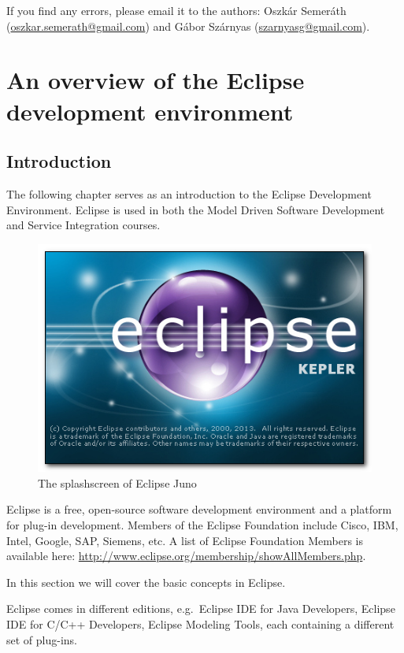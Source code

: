 \documentclass[]{report}
\let\Oldincludegraphics\includegraphics
\renewcommand{\includegraphics}[1]{
\begin{adjustbox}{max size={\textwidth}{\textheight}}
    \Oldincludegraphics[scale=0.6]{#1}%
\end{adjustbox}
}
\begin{document}
If you find any errors, please email it to the authors: Oszkár Semeráth
(\href{mailto:oszkar.semerath@gmail.com}{oszkar.semerath@gmail.com}) and
Gábor Szárnyas (\href{mailto:szarnyasg@gmail.com}{szarnyasg@gmail.com}).

\chapter{An overview of the Eclipse development environment}

\section{Introduction}

The following chapter serves as an introduction to the Eclipse
Development Environment. Eclipse is used in both the Model Driven
Software Development and Service Integration courses.

\begin{figure}[htbp]
\centering
\includegraphics{img/eclipse_basics/eclipse_logo.png}
\caption{The splashscreen of Eclipse Juno}
\end{figure}

Eclipse is a free, open-source software development environment and a
platform for plug-in development. Members of the Eclipse Foundation
include Cisco, IBM, Intel, Google, SAP, Siemens, etc. A list of Eclipse
Foundation Members is available here:
\url{http://www.eclipse.org/membership/showAllMembers.php}.

In this section we will cover the basic concepts in Eclipse.

Eclipse comes in different editions, e.g.~Eclipse IDE for Java
Developers, Eclipse IDE for C/C++ Developers, Eclipse Modeling Tools,
each containing a different set of plug-ins.
\end{document}
